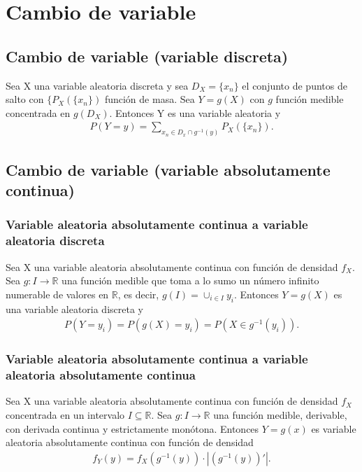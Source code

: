 \chapter{Cambio de variable}

\section{Cambio de variable (variable discreta)}

\begin{prop}
Sea X una variable aleatoria discreta y sea $D_X = \{x_n\}$ el conjunto de puntos de salto con $\{P_X(\{x_n\})$ función de masa. Sea $Y = g(X)$ con $g$ función medible concentrada en $g(D_X)$. Entonces Y es una variable aleatoria y
\begin{align*}
    P(Y = y) = \sum_{x_n \in D_x \cap g^{-1}(y)}{P_X(\{x_n\})}.
\end{align*}
\end{prop}

\section{Cambio de variable (variable absolutamente continua)}
\subsection{Variable aleatoria absolutamente continua a variable aleatoria discreta}

\begin{prop}
Sea X una variable aleatoria absolutamente continua con función de densidad $f_X$. Sea $g: I \longrightarrow \mathbb{R}$ una función medible que toma a lo sumo un número infinito numerable de valores en $\mathbb{R}$, es decir, $g(I) = \cup_{i \in I}{y_i}$. Entonces $Y = g(X)$ es una variable aleatoria discreta y
\begin{align*}
    P(Y = y_i) = P(g(X) = y_i) = P(X \in g^{-1}(y_i)).
\end{align*}
\end{prop}

\subsection{Variable aleatoria absolutamente continua a variable aleatoria absolutamente continua}

\begin{teo}
Sea X una variable aleatoria absolutamente continua con función de densidad $f_X$ concentrada en un intervalo $I \subseteq \mathbb{R}$. Sea $g: I \longrightarrow \mathbb{R}$ una función medible, derivable, con derivada continua y estrictamente monótona. Entonces $Y = g(x)$ es variable aleatoria absolutamente continua con función de densidad
\begin{align*}
    f_Y(y) = f_X(g^{-1}(y)) \cdot |(g^{-1}(y))'|.
\end{align*}
\end{teo}

